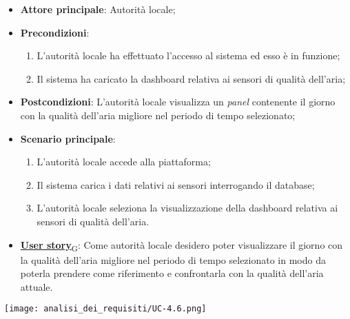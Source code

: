 \begin{itemize}
	\item \textbf{Attore principale}: Autorità locale;
	\item \textbf{Precondizioni}:
	      \begin{enumerate}
		      \item L'autorità locale ha effettuato l'accesso al sistema ed esso è in funzione;
		      \item Il sistema ha caricato la dashboard relativa ai sensori di qualità dell'aria;
	      \end{enumerate}
	\item \textbf{Postcondizioni}: L'autorità locale visualizza un \textit{panel} contenente il giorno con la qualità dell'aria migliore nel periodo di tempo selezionato;
	\item \textbf{Scenario principale}:
	      \begin{enumerate}
		      \item L'autorità locale accede alla piattaforma;
		      \item Il sistema carica i dati relativi ai sensori interrogando il database;
		      \item L'autorità locale seleziona la visualizzazione della dashboard relativa ai sensori di qualità dell'aria.
	      \end{enumerate}
	\item \href{https://7last.github.io/docs/rtb/documentazione-interna/glossario\#user-story}{\textbf{User story}\textsubscript{G}}:
	      Come autorità locale desidero poter visualizzare il giorno con la qualità dell'aria migliore nel periodo di tempo selezionato
	      in modo da poterla prendere come riferimento e confrontarla con la qualità dell'aria attuale.
\end{itemize}
\begin{center}
	\texttt{[image: analisi\_dei\_requisiti/UC-4.6.png]}
\end{center}

